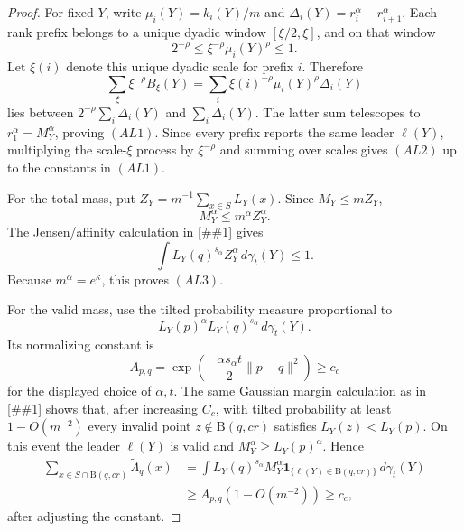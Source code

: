 \documentclass[10pt]{article}
\newcommand{\cref}[1]{\ref{##1}}
\theoremstyle{definition}
\newcommand{\Ball}{\mathrm{B}}
\begin{document}
\begin{proof}
   For fixed \(Y\), write
   \(\mu_i(Y)=k_i(Y)/m\) and
   \(\Delta_i(Y)=r_i^\alpha-r_{i+1}^\alpha\).  Each rank prefix belongs to a
   unique dyadic window \([\xi/2,\xi]\), and on that window
   \[
      2^{-\rho}\le \xi^{-\rho}\mu_i(Y)^\rho\le1 .
   \]
   Let \(\xi(i)\) denote this unique dyadic scale for prefix \(i\).  Therefore
   \[
      \sum_{\xi}\xi^{-\rho}B_\xi(Y)
      =
      \sum_i \xi(i)^{-\rho}\mu_i(Y)^\rho\Delta_i(Y)
   \]
   lies between \(2^{-\rho}\sum_i\Delta_i(Y)\) and
   \(\sum_i\Delta_i(Y)\).  The latter sum telescopes to
   \(r_1^\alpha=M_Y^\alpha\), proving \((AL1)\).  Since every prefix reports
   the same leader \(\ell(Y)\), multiplying the scale-\(\xi\) process by
   \(\xi^{-\rho}\) and summing over scales gives \((AL2)\) up to the constants
   in \((AL1)\).

   For the total mass, put \(Z_Y=m^{-1}\sum_{x\in S}L_Y(x)\).  Since
   \(M_Y\le mZ_Y\),
   \[
      M_Y^\alpha\le m^\alpha Z_Y^\alpha .
   \]
   The Jensen/affinity calculation in
   \cref{lem:ideal-likelihood-scale-profile} gives
   \[
      \int L_Y(q)^{s_\alpha}Z_Y^\alpha\,d\gamma_t(Y)\le1.
   \]
   Because \(m^\alpha=e^\kappa\), this proves \((AL3)\).

   For the valid mass, use the tilted probability measure proportional to
   \[
      L_Y(p)^\alpha L_Y(q)^{s_\alpha}\,d\gamma_t(Y).
   \]
   Its normalizing constant is
   \[
      A_{p,q}
      =
      \exp\!\left(-\frac{\alpha s_\alpha t}{2}\|p-q\|^2\right)
      \ge c_c
   \]
   for the displayed choice of \(\alpha,t\).  The same Gaussian margin
   calculation as in \cref{thm:continuous-likelihood-balls} shows that, after
   increasing \(C_c\), with tilted probability at least \(1-O(m^{-2})\) every
   invalid point \(z\notin\Ball(q,cr)\) satisfies \(L_Y(z)<L_Y(p)\).  On this
   event the leader \(\ell(Y)\) is valid and \(M_Y^\alpha\ge L_Y(p)^\alpha\).
   Hence
   \[
   \begin{aligned}
      \sum_{x\in S\cap\Ball(q,cr)}\widetilde\Lambda_q(x)
      &=
      \int L_Y(q)^{s_\alpha}M_Y^\alpha
      \mathbf 1_{\{\ell(Y)\in\Ball(q,cr)\}}\,d\gamma_t(Y)\\
      &\ge
      A_{p,q}(1-O(m^{-2}))
      \ge c_c ,
   \end{aligned}
   \]
   after adjusting the constant.
\end{proof}
\end{document}
